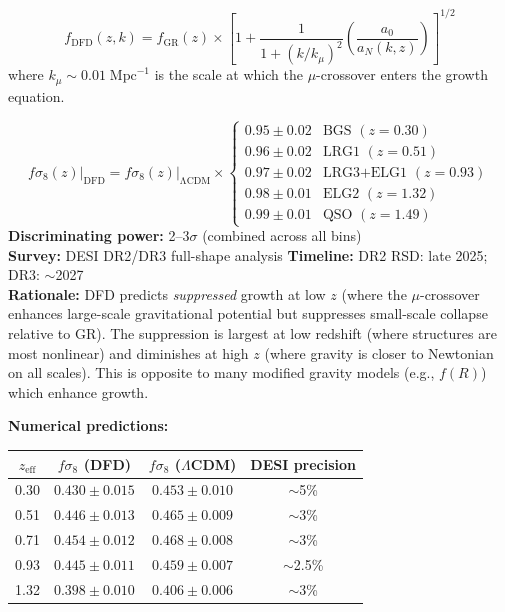 \documentclass[12pt]{article}
\newcommand{\LCDM}{$\Lambda$CDM}
\begin{document}
\begin{equation}
f_\mathrm{DFD}(z,k) = f_\mathrm{GR}(z) \times \left[1 + \frac{1}{1 + (k/k_\mu)^2}\left(\frac{a_0}{a_N(k,z)}\right)\right]^{1/2}
\end{equation}
where $k_\mu \sim 0.01\;\mathrm{Mpc}^{-1}$ is the scale at which the $\mu$-crossover enters the growth equation.

\begin{predbox}
\begin{equation}
\boxed{
f\sigma_8(z)\bigg|_\mathrm{DFD} = f\sigma_8(z)\bigg|_\mathrm{\Lambda CDM} \times \begin{cases}
0.95 \pm 0.02 & \text{BGS } (z=0.30) \\
0.96 \pm 0.02 & \text{LRG1 } (z=0.51) \\
0.97 \pm 0.02 & \text{LRG3+ELG1 } (z=0.93) \\
0.98 \pm 0.01 & \text{ELG2 } (z=1.32) \\
0.99 \pm 0.01 & \text{QSO } (z=1.49)
\end{cases}
}
\end{equation}
\textbf{Discriminating power:} 2--3$\sigma$ (combined across all bins)\\
\textbf{Survey:} DESI DR2/DR3 full-shape analysis \quad\textbf{Timeline:} DR2 RSD: late 2025; DR3: $\sim$2027\\
\textbf{Rationale:} DFD predicts \emph{suppressed} growth at low $z$ (where the $\mu$-crossover enhances large-scale gravitational potential but suppresses small-scale collapse relative to GR). The suppression is largest at low redshift (where structures are most nonlinear) and diminishes at high $z$ (where gravity is closer to Newtonian on all scales). This is opposite to many modified gravity models (e.g., $f(R)$) which enhance growth.

\medskip\noindent
\textbf{Numerical predictions:}
\begin{center}
\begin{tabular}{cccc}
\toprule
$z_\mathrm{eff}$ & $f\sigma_8$ (DFD) & $f\sigma_8$ (\LCDM) & DESI precision \\
\midrule
0.30 & $0.430 \pm 0.015$ & $0.453 \pm 0.010$ & $\sim$5\% \\
0.51 & $0.446 \pm 0.013$ & $0.465 \pm 0.009$ & $\sim$3\% \\
0.71 & $0.454 \pm 0.012$ & $0.468 \pm 0.008$ & $\sim$3\% \\
0.93 & $0.445 \pm 0.011$ & $0.459 \pm 0.007$ & $\sim$2.5\% \\
1.32 & $0.398 \pm 0.010$ & $0.406 \pm 0.006$ & $\sim$3\% \\
\bottomrule
\end{tabular}
\end{center}
\end{predbox}
\end{document}
